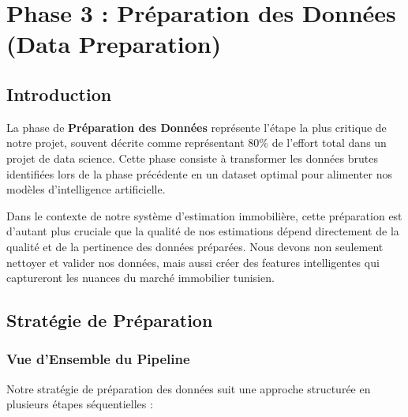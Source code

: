 \chapter{Phase 3 : Préparation des Données (Data Preparation)}
\label{chap:data_preparation}

\section{Introduction}
\label{sec:dp_introduction}

La phase de \textbf{Préparation des Données} représente l'étape la plus critique de notre projet, souvent décrite comme représentant 80\% de l'effort total dans un projet de data science. Cette phase consiste à transformer les données brutes identifiées lors de la phase précédente en un dataset optimal pour alimenter nos modèles d'intelligence artificielle.

Dans le contexte de notre système d'estimation immobilière, cette préparation est d'autant plus cruciale que la qualité de nos estimations dépend directement de la qualité et de la pertinence des données préparées. Nous devons non seulement nettoyer et valider nos données, mais aussi créer des features intelligentes qui captureront les nuances du marché immobilier tunisien.

\section{Stratégie de Préparation}
\label{sec:strategie_preparation}

\subsection{Vue d'Ensemble du Pipeline}
\label{subsec:pipeline_overview}

Notre stratégie de préparation des données suit une approche structurée en plusieurs étapes séquentielles :

